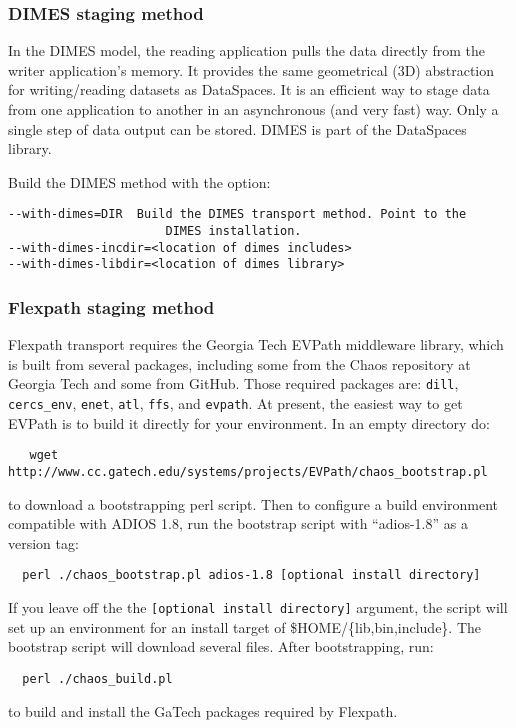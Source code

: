 \subsubsection{DIMES staging method}
In the DIMES model, the reading application pulls the data directly from the writer application's memory. It provides the same geometrical (3D) abstraction for writing/reading datasets as DataSpaces. It is an efficient way to stage data from one application to another in an asynchronous (and very fast) way. Only a single step of data output can be stored.
DIMES is part of the DataSpaces library.

\noindent Build the DIMES method with the option:

\begin{lstlisting}
--with-dimes=DIR  Build the DIMES transport method. Point to the
                      DIMES installation.
--with-dimes-incdir=<location of dimes includes>
--with-dimes-libdir=<location of dimes library>
\end{lstlisting}


\subsubsection{Flexpath staging method}
 Flexpath transport requires the Georgia Tech EVPath middleware library,
 which is built from several packages, including some from the Chaos
 repository at Georgia Tech and some from GitHub.  Those required packages
 are: \verb+dill+, \verb+cercs_env+, \verb+enet+, \verb+atl+, \verb+ffs+,
 and \verb+evpath+. 
At present, the easiest way to get EVPath is to build it directly for your environment. In an empty directory do:
\begin{lstlisting}
   wget http://www.cc.gatech.edu/systems/projects/EVPath/chaos_bootstrap.pl
\end{lstlisting}
to download a bootstrapping perl script.  Then to configure a build
environment compatible with ADIOS 1.8, run the bootstrap script with
``adios-1.8'' as a version tag:
\begin{lstlisting}
  perl ./chaos_bootstrap.pl adios-1.8 [optional install directory]
\end{lstlisting}

If you leave off the the \verb+[optional install directory]+ argument, the
script will set up an environment for an install target of
\$HOME/\{lib,bin,include\}.  The bootstrap script will download several
files.  After bootstrapping, run:
\begin{lstlisting}
  perl ./chaos_build.pl 
\end{lstlisting}
to build and install the GaTech packages required by Flexpath.


